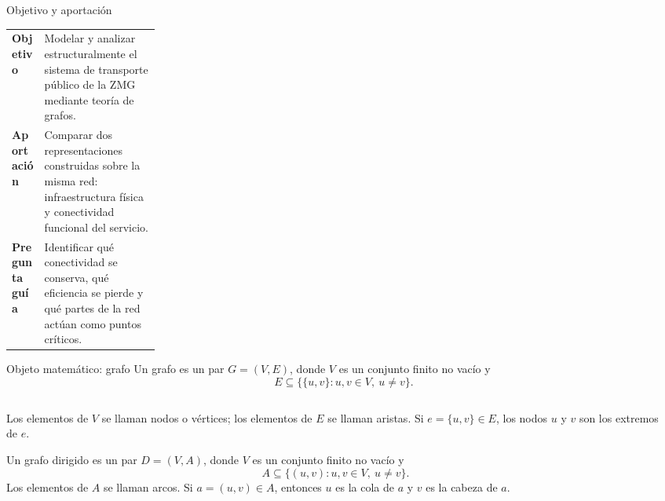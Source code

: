 \documentclass[aspectratio=169,10pt]{beamer}
\newcommand{\thinrule}{\par\vspace{0.2cm}\noindent{\color{linegray}\rule{0.88\linewidth}{0.45pt}}\par\vspace{0.2cm}}
\newcommand{\smallsource}[1]{%
  \vspace{0.08cm}{\scriptsize\color{midgray}#1}
}
\begin{document}
\begin{frame}{Objetivo y aportación}
  \begin{tabularx}{\linewidth}{@{}>{\bfseries}p{0.22\linewidth}X@{}}
    Objetivo & Modelar y analizar estructuralmente el sistema de transporte público de la ZMG mediante teoría de grafos. \\
    Aportación & Comparar dos representaciones construidas sobre la misma red: infraestructura física y conectividad funcional del servicio. \\
    Pregunta guía & Identificar qué conectividad se conserva, qué eficiencia se pierde y qué partes de la red actúan como puntos críticos.
  \end{tabularx}

  \thinrule

\end{frame}

\begin{frame}{Objeto matemático: grafo}
  Un grafo es un par \(G=(V,E)\), donde \(V\) es un conjunto finito no vacío y
  \[
    E\subseteq \bigl\{\{u,v\}:u,v\in V,\ u\neq v\bigr\}.
  \]

  \vspace{0.08cm}
  \begin{columns}[T,onlytextwidth]
    \begin{column}{0.58\linewidth}
      Los elementos de \(V\) se llaman nodos o vértices; los elementos de \(E\) se llaman aristas. Si \(e=\{u,v\}\in E\), los nodos \(u\) y \(v\) son los extremos de \(e\).

      \thinrule

      Un grafo dirigido es un par \(D=(V,A)\), donde \(V\) es un conjunto finito no vacío y
      \[
        A\subseteq \{(u,v):u,v\in V,\ u\neq v\}.
      \]
      Los elementos de \(A\) se llaman arcos. Si \(a=(u,v)\in A\), entonces \(u\) es la cola de \(a\) y \(v\) es la cabeza de \(a\).
    \end{column}
    \begin{column}{0.38\linewidth}
      \centering

      \smallsource{Ejemplo de grafo no dirigido.}
    \end{column}
  \end{columns}
\end{frame}
\end{document}
